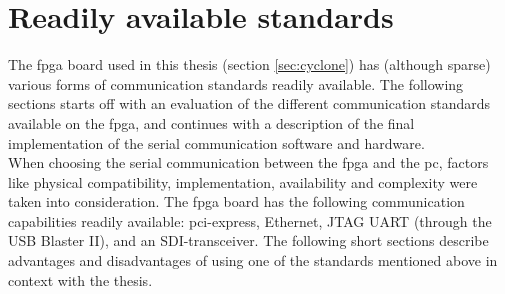 \documentclass[main.tex]{subfiles}
\begin{document}

\section{Readily available standards}
The \gls{fpga} board used in this thesis (section \ref{sec:cyclone}) has (although sparse) various forms of communication standards readily available. The following sections starts off with an evaluation of the different communication standards available on the \gls{fpga}, and continues with a description of the final implementation of the serial communication software and hardware.
\\

When choosing the serial communication between the \gls{fpga} and the \acrshort{pc}, factors like physical compatibility, implementation, availability and complexity were taken into consideration. The \gls{fpga} board has the following communication capabilities readily available: \gls{pci}-express, Ethernet, JTAG UART (through the USB Blaster II), and an SDI-transceiver. The following short sections describe advantages and disadvantages of using one of the standards mentioned above in context with the thesis.
\end{document}
